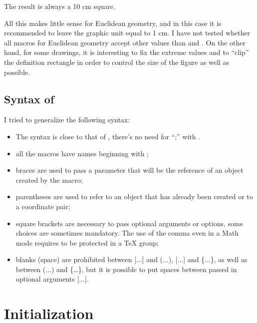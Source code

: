 \begin{tkzltxexample}[right margin=6cm,small]
\tkzInit[xmax=10000,ymax=100000,xstep=1000,ystep=10000]
\end{tkzltxexample}

The result is always a 10 cm square.

All this makes little sense for Euclidean geometry, and in this case it is
recommended to leave the graphic unit equal to 1 cm. I have not tested whether
all macros for Euclidean geometry accept other values than  and
. On the other hand, for some drawings, it is interesting to
fix the extreme values and to \enquote{clip} the definition rectangle in order to
control the size of the figure as well as possible.

\subsection{Syntax of }

I tried to generalize the following syntax:

\begin{itemize}
\item The syntax is close to that of \LATEX, there's no need for \enquote{;} with
.

\item all the macros have names beginning with ;

\item braces are used to pass a parameter that will be the reference of an
object created by the macro;

\item parentheses are used to refer to an object that has already been created
or to a coordinate pair;

\item square brackets are necessary to pass optional arguments or options,
some choices are sometimes mandatory. The use of the comma even in a Math mode
requires to be protected in a TeX group;

\item blanks (space) are prohibited between [...] and (...), [...] and
\{...\},  as well as between (...) and \{…\}, but it is possible to put spaces
between passed in optional arguments [...].
\end{itemize}

\section{Initialization }

